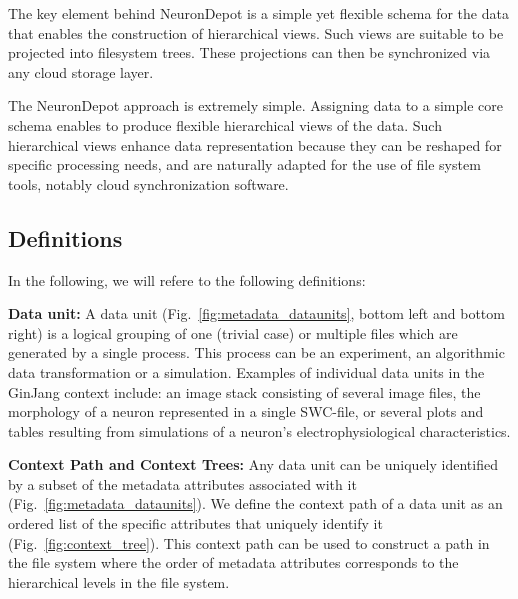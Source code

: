 \documentclass{frontiersSCNS} %
\begin{document}
The key element behind NeuronDepot is a simple yet flexible schema for the data
that enables the construction of  hierarchical views. Such views are suitable
to be projected into filesystem trees. These projections can then be
synchronized via any cloud storage layer. 

The NeuronDepot approach is extremely simple. Assigning data to a simple core
schema enables to produce flexible hierarchical views of the data. Such
hierarchical views enhance data representation because they can be reshaped for
specific processing needs, and are naturally adapted for the use of file system
tools, notably cloud synchronization software.

\subsection{Definitions}

In the following, we will refere to the following definitions:

\textbf{Data unit:} A data unit (Fig.~\ref{fig:metadata_dataunits}, bottom
left and bottom right) is a logical grouping of one (trivial case) or multiple
files which are generated by a single process. This process can be an
experiment, an algorithmic data transformation or a simulation. Examples of
individual data units in the GinJang context include: an image stack consisting
of several image files, the morphology of a neuron represented in a single
SWC-file, or several plots and tables resulting from simulations of a neuron's
electrophysiological characteristics.

\textbf{Context Path and Context Trees:} Any data unit can be uniquely
identified by a subset of the metadata attributes associated with it
(Fig.~\ref{fig:metadata_dataunits}). We define the context path of a data unit
as an ordered list of the specific attributes that uniquely identify it
(Fig.~\ref{fig:context_tree}). This context path can be used to construct a
path in the file system where the order of metadata attributes corresponds to
the hierarchical levels in the file system.
\end{document}
